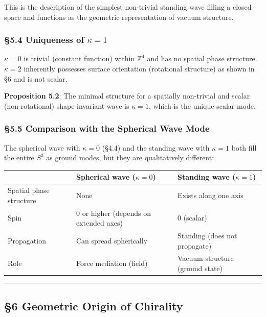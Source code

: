 \documentclass[
  a4paper,11pt]{article}
\newcounter{none}
\theoremstyle{definition}
\theoremstyle{remark}
\begin{document}
This is the description of the simplest non-trivial standing wave
filling a closed space and functions as the geometric representation of
vacuum structure.

\subsubsection{\texorpdfstring{§5.4 Uniqueness of
\(\kappa = 1\)}{§5.4 Uniqueness of \textbackslash kappa = 1}}\label{uniqueness-of-kappa-1}

\(\kappa = 0\) is trivial (constant function) within \(\mathbb{Z}^4\)
and has no spatial phase structure. \(\kappa = 2\) inherently possesses
surface orientation (rotational structure) as shown in §6 and is not
scalar.

\textbf{Proposition 5.2}: The minimal structure for a spatially
non-trivial and scalar (non-rotational) shape-invariant wave is
\(\kappa = 1\), which is the unique scalar mode.

\subsubsection{§5.5 Comparison with the Spherical Wave
Mode}\label{comparison-with-the-spherical-wave-mode}

The spherical wave with \(\kappa = 0\) (§4.4) and the standing wave with
\(\kappa = 1\) both fill the entire \(S^3\) as ground modes, but they
are qualitatively different:

{\def\LTcaptype{none} %
\begin{longtable}[]{@{}lll@{}}
\toprule\noalign{}
& Spherical wave (\(\kappa = 0\)) & Standing wave (\(\kappa = 1\)) \\
\midrule\noalign{}
\endhead
\bottomrule\noalign{}
\endlastfoot
Spatial phase structure & None & Exists along one axis \\
Spin & 0 or higher (depends on extended axes) & 0 (scalar) \\
Propagation & Can spread spherically & Standing (does not propagate) \\
Role & Force mediation (field) & Vacuum structure (ground state) \\
\end{longtable}
}

\begin{center}\rule{0.5\linewidth}{0.5pt}\end{center}

\subsection{§6 Geometric Origin of
Chirality}\label{geometric-origin-of-chirality}
\end{document}
